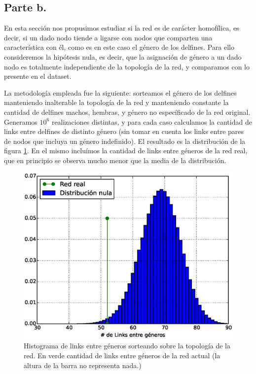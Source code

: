 \subsection{Parte b.}

\par En esta sección nos propusimos estudiar si la red es de carácter homofílica, es decir, si un dado nodo tiende a ligarse con nodos que comparten una característica con él, como es en este caso el género de los delfines. Para ello consideremos la hipótesis nula, es decir, que la asignación de género a un dado nodo es totalmente independiente de la topología de la red, y comparamos con lo presente en el dataset.
\par La metodología empleada fue la siguiente: sorteamos el género de los delfines manteniendo inalterable la topología de la red y manteniendo constante la cantidad de delfines machos, hembras, y género no específicado de la red original. Generamos $10^{6}$ realizaciones distintas, y para cada caso calculamos la cantidad de links entre delfines de distinto género (sin tomar en cuenta los links entre pares de nodos que incluya un género indefinido). El resultado es la distribución de la figura \ref{fig:Histograma}. En el mismo incluímos la cantidad de links entre géneros de la red real, que en principio se observa mucho menor que la media de la distribución.

\begin{figure}
\centering
\includegraphics[scale = 0.70]{figuras/Histograma.eps}
\caption{Histograma de links entre géneros sorteando sobre la topología de la red. En verde cantidad de links entre géneros de la red actual (la altura de la barra no representa nada.)}
\label{fig:Histograma}
\end{figure}

